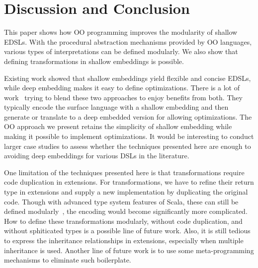 \section{Discussion and Conclusion}
This paper shows how OO programming improves the modularity of shallow EDSLs.
With the procedural abstraction mechanisms provided by OO languages, various types of
interpretations can be defined modularly. We also show that defining
transformations in shallow embeddings is possible.

Existing work showed that shallow embeddings yield flexible and
concise EDSLs, while deep embedding makes it easy to define
optimizations. There is a lot of work~\cite{svenningsson2012combining,
  Jovanovic:2014:YCD:2658761.2658771, scherr2014implicit} trying to blend these two
approaches to enjoy benefits from both.
They typically encode the surface language with a shallow embedding and
then generate or translate to a deep embedded version for allowing optimizations.
The OO approach we present retains the simplicity of shallow embedding while
making it possible to implement optimizations. It would be interesting
to conduct larger case studies to assess whether the techniques
presented here are enough to avoiding deep embeddings for various DSLs
in the literature. 

One limitation of the techniques presented here is that
transformations require code duplication in extensions.  For
transformations, we have to refine their return type in extensions and
supply a new implementation by duplicating the original code. 
Though with advanced type system features of Scala, these can still be defined
modularly~\cite{zenger05independentlyextensible}, the encoding would
become significantly more complicated.
How to define these transformations modularly, without code
duplication, and without sphiticated types
is a possible line of future work.  Also, it is still tedious to
express the inheritance relationships in extensions, especially when
multiple inheritance is used. Another line of future work is to use
some meta-programming mechanisms to eliminate such boilerplate.
